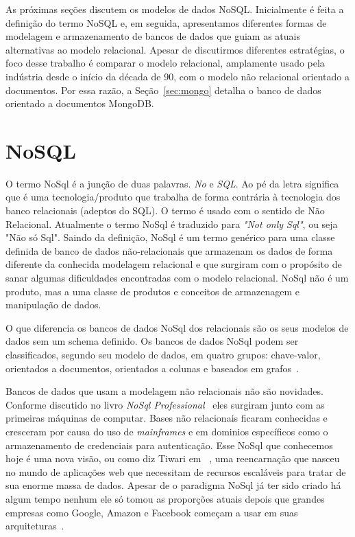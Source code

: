 
As próximas seções discutem os modelos de dados NoSQL. Inicialmente é
feita a definição do termo NoSQL e, em seguida,
apresentamos diferentes formas de modelagem e armazenamento de bancos de
dados que guiam as atuais alternativas ao modelo relacional. Apesar de
discutirmos diferentes estratégias, o foco desse trabalho é comparar o
modelo relacional, amplamente usado pela indústria desde o início da
década de 90, com o modelo não relacional orientado a documentos. Por
essa razão, a Seção~\ref{sec:mongo} detalha o banco de dados orientado
a documentos MongoDB. 


\section{NoSQL}

O termo NoSql é a junção de duas palavras. \textit{No} e \textit{SQL}. Ao pé da letra significa que é uma tecnologia/produto que trabalha de forma contrária à tecnologia dos banco relacionais (adeptos do SQL). O termo é usado com o sentido de Não Relacional. Atualmente o termo NoSql é traduzido para \textit{"Not only Sql"}, ou seja "Não só Sql".
Saindo da definição, NoSql é um termo genérico para uma classe definida de banco de dados não-relacionais que armazenam os dados  de forma diferente da conhecida modelagem relacional e que surgiram com o propósito de sanar algumas dificuldades encontradas com o modelo relacional. NoSql não é um produto, mas a uma classe de produtos e conceitos de armazenagem e manipulação de dados. 

O que diferencia os bancos de dados NoSql dos relacionais são os seus modelos de dados sem um schema definido. Os bancos de dados NoSql podem ser classificados, segundo seu modelo de dados, em quatro grupos: chave-valor, orientados a documentos, orientados a colunas e baseados em grafos~\cite{nosqlxrelacional,nosqlevaluation}.

Bancos de dados que usam a modelagem não relacionais não são novidades. Conforme discutido no livro \emph{NoSql Professional}~\cite{nosqlprofessional} eles surgiram junto com as primeiras máquinas de computar. Bases não relacionais ficaram conhecidas e cresceram por causa do uso de \textit{mainframes} e em dominios específicos como o armazenamento de credenciais para autenticação. Esse NoSql que conhecemos hoje é uma nova visão, ou como diz Tiwari em ~\cite{nosqlprofessional}, uma reencarnação que nasceu no mundo de aplicações web que necessitam de recursos escaláveis para tratar de sua enorme massa de dados. Apesar de o paradigma NoSql já ter sido criado há algum tempo nenhum ele só tomou as proporções atuais depois que grandes empresas como Google, Amazon e Facebook começam a usar em suas arquiteturas~\cite{nosqlevaluation}.


